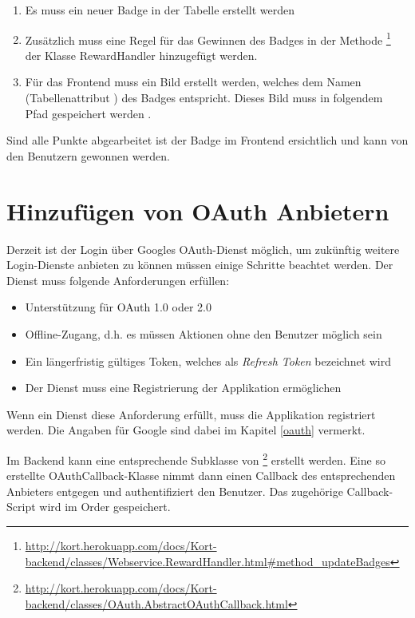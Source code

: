 \begin{enumerate}
\item Es muss ein neuer Badge in der Tabelle  erstellt werden
\item Zusätzlich muss eine Regel für das Gewinnen des Badges in der Methode \footnote{\url{http://kort.herokuapp.com/docs/Kort-backend/classes/Webservice.RewardHandler.html\#method_updateBadges}} der Klasse RewardHandler hinzugefügt werden.
\item Für das Frontend muss ein Bild erstellt werden, welches dem Namen (Tabellenattribut ) des Badges entspricht. Dieses Bild muss in folgendem Pfad gespeichert werden .
\end{enumerate}

Sind alle Punkte abgearbeitet ist der Badge im Frontend ersichtlich und kann von den Benutzern gewonnen werden.

\section{Hinzufügen von OAuth Anbietern}
\label{kort-additional-oauth-provider}
Derzeit ist der Login über Googles \gls{OAuth}-Dienst möglich, um zukünftig weitere Login-Dienste anbieten zu können müssen einige Schritte beachtet werden.
Der Dienst muss folgende Anforderungen erfüllen:
\begin{itemize}
\item Unterstützung für OAuth 1.0 oder 2.0
\item Offline-Zugang, d.h. es müssen Aktionen ohne den Benutzer möglich sein
\item Ein längerfristig gültiges Token, welches als \emph{Refresh Token} bezeichnet wird
\item Der Dienst muss eine Registrierung der Applikation ermöglichen
\end{itemize}

Wenn ein Dienst diese Anforderung erfüllt, muss die Applikation registriert werden.
Die Angaben für Google sind dabei im Kapitel \ref{oauth} vermerkt.

Im Backend kann eine entsprechende Subklasse von \footnote{\url{http://kort.herokuapp.com/docs/Kort-backend/classes/OAuth.AbstractOAuthCallback.html}} erstellt werden. 
Eine so erstellte OAuthCallback-Klasse nimmt dann einen Callback des entsprechenden Anbieters entgegen und authentifiziert den Benutzer.
Das zugehörige Callback-Script wird im Order  gespeichert.

